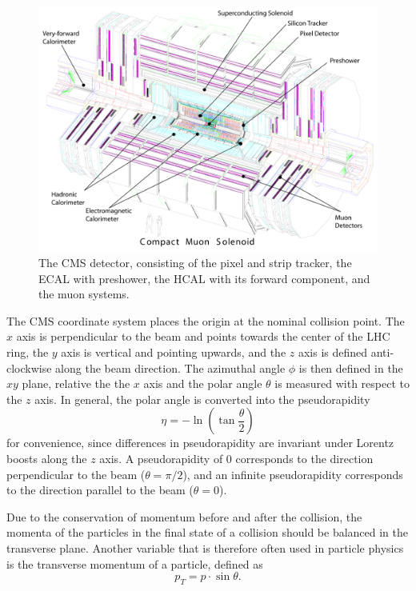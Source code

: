 \begin{figure}[ht]
  \centering
 \includegraphics[width=.9\textwidth]{cms_complete_labelled}
 \caption{The \ac{CMS} detector, consisting of the pixel and strip tracker, the \protect\acf{ECAL} with preshower, the \protect\acf{HCAL} with its forward component, and the muon systems.}
 \label{fig:CMS}
\end{figure}

The CMS coordinate system places the origin at the nominal collision point. The $x$ axis is perpendicular to the beam and points towards the center of the \ac{LHC} ring, the $y$ axis is vertical and pointing upwards, and the $z$ axis is defined anti-clockwise along the beam direction. The azimuthal angle $\phi$ is then defined in the $xy$ plane, relative the the $x$ axis and the polar angle $\theta$ is measured with respect to the $z$ axis. In general, the polar angle is converted into the pseudorapidity
\begin{equation}
 \eta = -\ln\left(\tan\frac{\theta}{2}\right)
\end{equation}
for convenience, since differences in pseudorapidity are invariant under Lorentz boosts along the $z$ axis. A pseudorapidity of 0 corresponds to the direction perpendicular to the beam ($\theta = \pi/2$), and an infinite pseudorapidity corresponds to the direction parallel to the beam ($\theta = 0$).

Due to the conservation of momentum before and after the collision, the momenta of the particles in the final state of a collision should be balanced in the transverse plane. Another variable that is therefore often used in particle physics is the transverse momentum of a particle, defined as 
\begin{equation}
p_T = p \cdot \sin \theta .
\end{equation}

